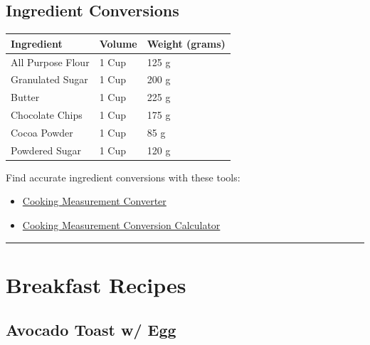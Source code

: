 \documentclass[
]{book}
\providecommand{\tightlist}{%
  \setlength{\itemsep}{0pt}\setlength{\parskip}{0pt}}
\begin{document}
\section*{Ingredient Conversions}\label{ingredient-conversions}

\begin{longtable}[]{@{}lll@{}}
\toprule\noalign{}
\textbf{Ingredient} & \textbf{Volume} & \textbf{Weight (grams)} \\
\midrule\noalign{}
\endhead
\bottomrule\noalign{}
\endlastfoot
All Purpose Flour & 1 Cup & 125 g \\
Granulated Sugar & 1 Cup & 200 g \\
Butter & 1 Cup & 225 g \\
Chocolate Chips & 1 Cup & 175 g \\
Cocoa Powder & 1 Cup & 85 g \\
Powdered Sugar & 1 Cup & 120 g \\
\end{longtable}

Find accurate ingredient conversions with these tools:

\begin{itemize}
\tightlist
\item
  \href{https://www.omnicalculator.com/food/cooking-measurement}{Cooking
  Measurement Converter}
\item
  \href{https://goodcalculators.com/cooking-conversion-calculator/}{Cooking
  Measurement Conversion Calculator}
\end{itemize}

\begin{center}\rule{0.5\linewidth}{0.5pt}\end{center}

\chapter{Breakfast Recipes}\label{breakfast-recipes}

\section*{Avocado Toast w/ Egg}\label{avocado-toast-w-egg}
\end{document}
